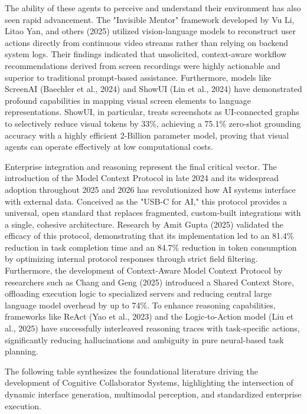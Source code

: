 \documentclass[12pt, a4paper]{report}
\begin{document}
The ability of these agents to perceive and understand their environment has also seen rapid advancement. The "Invisible Mentor" framework developed by Vu Li, Litao Yan, and others (2025) utilized vision-language models to reconstruct user actions directly from continuous video streams rather than relying on backend system logs.\cite{hojo2025} Their findings indicated that unsolicited, context-aware workflow recommendations derived from screen recordings were highly actionable and superior to traditional prompt-based assistance.\cite{hojo2025} Furthermore, models like ScreenAI (Baechler et al., 2024) and ShowUI (Lin et al., 2024) have demonstrated profound capabilities in mapping visual screen elements to language representations.\cite{hojo2025} ShowUI, in particular, treats screenshots as UI-connected graphs to selectively reduce visual tokens by 33\%, achieving a 75.1\% zero-shot grounding accuracy with a highly efficient 2-Billion parameter model, proving that visual agents can operate effectively at low computational costs.\cite{hojo2025}

Enterprise integration and reasoning represent the final critical vector. The introduction of the Model Context Protocol in late 2024 and its widespread adoption throughout 2025 and 2026 has revolutionized how AI systems interface with external data.\cite{rootstack2026} Conceived as the "USB-C for AI," this protocol provides a universal, open standard that replaces fragmented, custom-built integrations with a single, cohesive architecture.\cite{thoughtworks2026} Research by Amit Gupta (2025) validated the efficacy of this protocol, demonstrating that its implementation led to an 81.4\% reduction in task completion time and an 84.7\% reduction in token consumption by optimizing internal protocol responses through strict field filtering.\cite{hojo2025} Furthermore, the development of Context-Aware Model Context Protocol by researchers such as Chang and Geng (2025) introduced a Shared Context Store, offloading execution logic to specialized servers and reducing central large language model overhead by up to 74\%.\cite{arxiv2601} To enhance reasoning capabilities, frameworks like ReAct (Yao et al., 2023) and the Logic-to-Action model (Liu et al., 2025) have successfully interleaved reasoning traces with task-specific actions, significantly reducing hallucinations and ambiguity in pure neural-based task planning.\cite{hojo2025}

The following table synthesizes the foundational literature driving the development of Cognitive Collaborator Systems, highlighting the intersection of dynamic interface generation, multimodal perception, and standardized enterprise execution.
\end{document}

